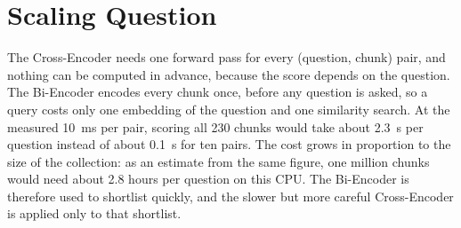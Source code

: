\documentclass[11pt,a4paper]{article}
\begin{document}
\section{Scaling Question}

The Cross-Encoder needs one forward pass for every (question, chunk) pair, and nothing can be computed in advance,
because the score depends on the question. The Bi-Encoder encodes every chunk once, before any question is asked,
so a query costs only one embedding of the question and one similarity search. At the measured 10~ms per pair,
scoring all 230 chunks would take about 2.3~s per question instead of about 0.1~s for ten pairs. The cost grows in
proportion to the size of the collection: as an estimate from the same figure, one million chunks would need about
2.8 hours per question on this CPU. The Bi-Encoder is therefore used to shortlist quickly, and the slower but more
careful Cross-Encoder is applied only to that shortlist.
\end{document}
